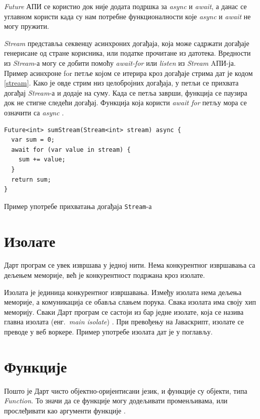 \documentclass[12pt,oneside]{memoir}
\begin{document}
\textit{Future} АПИ се користио док није додата подршка за \textit{async} и \textit{await}, а данас се углавном користи када су нам потребне функционалности које \textit{async} и \textit{await} не могу пружити.

\textit{Stream} представља секвенцу асинхроних догађаја, која може садржати догађаје генерисане од стране корисника, или податке прочитане из датотека.  Вредности из \textit{Stream}-а могу се добити помоћу \textit{await-for} или \textit{listen} из \textit{Stream} AПИ-ја. Пример асинхроне for петље којом се итерира кроз догађаје стрима дат је кодом \ref{stream}. Како је овде стрим низ целобројних догађаја, у петљи се прихвата догађај \textit{Stream}-а и додаје на суму. Када се петља заврши, функција се паузира док не стигне следећи догађај. Функција која користи \textit{await for} петљу мора се означити са \textit{async} \cite{dart, dart1}.

\begin{listing}
\begin{verbatim}
Future<int> sumStream(Stream<int> stream) async {
  var sum = 0;
  await for (var value in stream) {
    sum += value;
  }
  return sum;
}
\end{verbatim}
\caption{Пример употребе прихватања догађаја \texttt{Stream}-а}
\label{stream}
\end{listing}
\section{Изолате}
\label{dart_izolate}
Дарт програм се увек извршава у једној нити. Нема конкурентног извршавања са дељењем меморије, већ је конкурентност подржана кроз изолате.

Изолата је јединица конкурентног извршавања. Између изолата нема дељења меморије, а комуникација се обавља слањем порука. Свака изолата има своју хип меморију. Сваки Дарт програм се састоји из бар једне изолате, која се назива главна изолата (енг.~\textit{main isolate}) \cite{dart, dart1}. При превођењу на Јаваскрипт, изолате се преводе у веб воркере. Пример употребе изолата дат је у поглављу.

\section{Функције}
\label{funkcije}
Пошто је Дарт чисто објектно-оријентисани језик, и функције су објекти, типа \textit{Function}. То значи да се функције могу додељивати променљивама, или прослеђивати као аргументи функције \cite{dart, dart1}.
\end{document}
